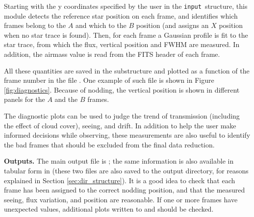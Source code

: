 \documentclass[a4paper]{article}
\newcommand{\inp}{\texttt{input}}
\begin{document}
\begin{sloppypar}
Starting with the y coordinates specified by the user in the \inp\ structure, this module detects the reference star position on each frame, and identifies which frames belong to the $A$ and which to the $B$ position (and assigns an $X$ position when no star trace is found). Then, for each frame a Gaussian profile is fit to the star trace, from which the flux, vertical position and FWHM are measured. In addition, the airmass value is read from the FITS header of each frame.

All these quantities are saved in the substructure  and plotted as a function of the frame number in the file . One example of such file is shown in Figure \ref{fig:diagnostics}. Because of nodding, the vertical position is shown in different panels for the $A$ and the $B$ frames.

The diagnostic plots can be used to judge the trend of transmission (including the effect of cloud cover), seeing, and drift. In addition to help the user make informed decisions while observing, these measurements are also useful to identify the bad frames that should be excluded from the final data reduction.

\medskip
\noindent
\textbf{Outputs.} The main output file is ; the same information is also available in tabular form in  (these two files are also saved to the output directory, for reasons explained in Section \ref{sec:dir_structure}).  It is a good idea to check that each frame has been assigned to the correct nodding position, and that the measured seeing, flux variation, and position are reasonable. If one or more frames have unexpected values, additional plots written to  and  should be checked.


\end{sloppypar}
\end{document}
